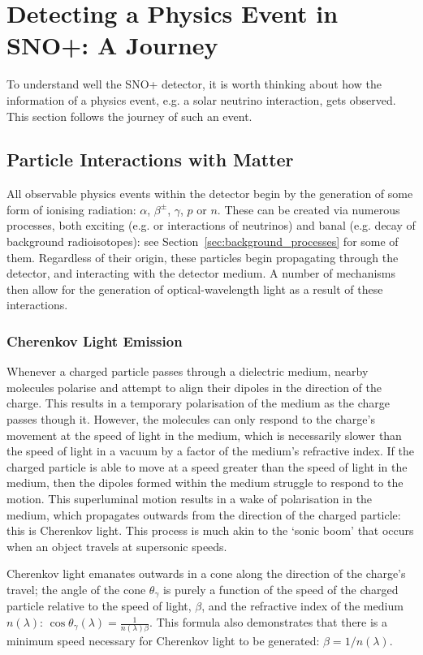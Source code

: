 \section{Detecting a Physics Event in SNO+: A Journey}
To understand well the SNO+ detector, it is worth thinking about how the information of a physics event, e.g. a solar neutrino interaction, gets observed. This section follows the journey of such an event.
\subsection{Particle Interactions with Matter}\label{sec:interactions_w_matter}
All observable physics events within the detector begin by the generation of some form of ionising radiation: $\alpha$, $\beta^{\pm}$, $\gamma$, $p$ or $n$. These can be created via numerous processes, both exciting (e.g. \onbb{} or interactions of neutrinos) and banal (e.g. decay of background radioisotopes): see Section~\ref{sec:background_processes} for some of them. Regardless of their origin, these particles begin propagating through the detector, and interacting with the detector medium. A number of mechanisms then allow for the generation of optical-wavelength light as a result of these interactions.
\subsubsection{Cherenkov Light Emission}
Whenever a charged particle passes through a dielectric medium, nearby molecules polarise and attempt to align their dipoles in the direction of the charge. This results in a temporary polarisation of the medium as the charge passes though it. However, the molecules can only respond to the charge's movement at the speed of light in the medium, which is necessarily slower than the speed of light in a vacuum by a factor of the medium's refractive index. If the charged particle is able to move at a speed greater than the speed of light in the medium, then the dipoles formed within the medium struggle to respond to the motion. This superluminal motion results in a wake of polarisation in the medium, which propagates outwards from the direction of the charged particle: this is Cherenkov light. This process is much akin to the `sonic boom' that occurs when an object travels at supersonic speeds.

Cherenkov light emanates outwards in a cone along the direction of the charge's travel; the angle of the cone $\theta_{\gamma}$ is purely a function of the speed of the charged particle relative to the speed of light, $\beta$, and the refractive index of the medium $n(\lambda)$: $\cos{\theta_{\gamma}}(\lambda) = \frac{1}{n(\lambda)\beta}$. This formula also demonstrates that there is a minimum speed necessary for Cherenkov light to be generated: $\beta = 1/n(\lambda)$.

